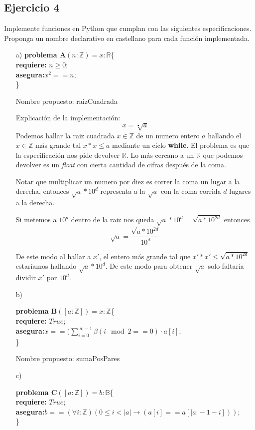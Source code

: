 \documentclass[10pt,a4paper]{article}
\begin{document}
\subsection*{Ejercicio 4}
Implemente funciones en Python que cumplan con las siguientes especificaciones. Proponga un
nombre declarativo en castellano para cada función implementada.
\begin{enumerate}
\item[a)]
\textbf{problema A}$(n : \mathbb{Z})=x: \mathbb{R}$\{ \\
	\textbf{  requiere:} $n \geq0;$\\
	\textbf{  asegura:}$x^{2} == n;$\\
	\}
	
Nombre propuesto: raizCuadrada

Explicación de la implementación:
$$x= \sqrt[•]{a}$$
Podemos hallar la raiz cuadrada $x\in \mathbb{Z}$ de un numero entero $a$ hallando el $x\in \mathbb{Z}$ más grande tal $x*x\leq a $ mediante un ciclo \textbf{while}. El problema es que la especificación nos pide devolver $\mathbb{R}$. Lo más cercano a un $\mathbb{R}$ que podemos devolver es un \textit{float} con cierta cantidad de cifras después de la coma.

Notar que multiplicar un numero por diez es correr la coma un lugar a la derecha, entonces $\sqrt{a}\ast 10^{d}$ representa a la $\sqrt{a}$ con la coma corrida $d$ lugares a la derecha.

Si metemos a $10^{d}$ dentro de la raiz nos queda $\sqrt{a}\ast 10^{d}=\sqrt{a\ast 10^{2d}}$ entonces 
$$\sqrt{a}=\frac{\sqrt{a\ast 10^{2d}}}{10^{d}}$$

De este modo al hallar a $x'$, el entero más grande tal que $x'\ast x' \leq \sqrt{a\ast 10^{2d}}$ estaríamos hallando $\sqrt{a}\ast 10^{d}$. De este modo para obtener $\sqrt{a}$ solo faltaría dividir $x'$ por $10^{d}$.
\item[b)]

\textbf{problema B}$([a : \mathbb{Z}])=x: \mathbb{Z}$\{ \\
	\textbf{  requiere:} $True;$\\
	\textbf{  asegura:}$x==(\sum^{|a|-1}_{i=0}\beta (i \mod 2==0)\cdot a[i];$\\
	\}
	
Nombre propuesto: sumaPosPares

\item[c)]

\textbf{problema C}$([a : \mathbb{Z}])=b: \mathbb{B}$\{ \\
	\textbf{  requiere:} $True;$\\
	\textbf{  asegura:}$b==(\forall i:\mathbb{Z})(0\leq i <|a|\rightarrow (a[i]==a[|a|-1-i]));$\\
	\}


\end{enumerate}
\end{document}
